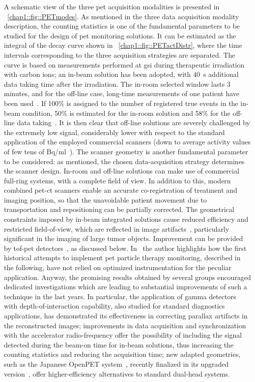 A schematic view of the three \gls{pet} acquisition modalities is presented in \figurename~\ref{chap1::fig::PETmodes}. As mentioned in the three data acquisition modality description, the counting statistics is one of the fundamental parameters to be studied for the design of \gls{pet} monitoring solutions. It can be estimated as the integral of the decay curve shown in \figurename~\ref{chap1::fig::PETactDistr}, where the time intervals corresponding to the three acquisition strategies are separated. The curve is based on measurements performed at \gls{gsi} during therapeutic irradiation with carbon ions; an in-beam solution has been adopted, with 40~s additional data taking time after the irradiation. The in-room selected window lasts 3 minutes, and for the off-line case, long-time measurements of one patient have been used~\parencite{Fiedler2008b}. If 100\% is assigned to the number of registered true events in the in-beam condition, 50\% is estimated for the in-room solution and 58\% for the off-line data taking~\parencite{Shakirin2011}. It is then clear that off-line solutions are severely challenged by the extremely low signal, considerably lower with respect to the standard application of the employed commercial scanners (down to average activity values of few tens of Bq/ml~\parencite{Bauer2013}).
The scanner geometry is another fundamental parameter to be considered: as mentioned, the chosen data-acquisition strategy determines the scanner design. In-room and off-line solutions can make use of commercial full-ring systems, with a complete field of view. In addition to this, modern combined \gls{pet}-\gls{ct} scanners enable an accurate co-registration of treatment and imaging position, so that the unavoidable patient movement due to transportation and repositioning can be partially corrected. The geometrical constraints imposed by in-beam integrated solutions cause reduced efficiency and restricted field-of-view, which are reflected in image artifacts~\parencite{Crespo2006}, particularly significant in the imaging of large tumor objects. Improvement can be provided by \gls{tof}-\gls{pet} detectors~\parencite{Crespo2007, Surti2011}, as discussed below.
In~\cite{Parodi2015} the author highlights how the first historical attempts to implement \gls{pet} particle therapy monitoring, described in the following, have not relied on optimized instrumentation for the peculiar application. Anyway, the promising results obtained by several groups encouraged dedicated investigations which are leading to substantial improvements of such a technique in the last years. In particular, the application of gamma detectors with depth-of-interaction capability, also studied for standard diagnostics applications, has demonstrated its effectiveness in correcting parallax artifacts in the reconstructed images; improvements in data acquisition and synchronization with the accelerator radio-frequency offer the possibility of including the signal detected during the beam-on time for in-beam solutions, thus increasing the counting statistics and reducing the acquisition time; new adapted geometries, such as the Japanese OpenPET system~\parencite{Tashima2012, Yamaya2008}, recently finalized in its upgraded version~\parencite{Yamaya2017}, offer higher-efficiency alternatives to standard dual-head systems. 
